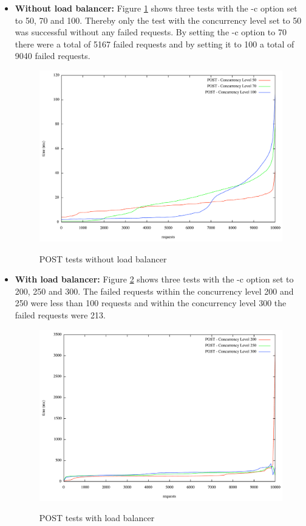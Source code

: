\begin{itemize}
\item{\textbf{Without load balancer:}} Figure \ref{fig:post_without_load} shows three tests with the -c option set to 50, 70 and 100. Thereby only the test with the concurrency level set to 50 was successful without any failed requests. By setting the -c option to 70 there were a total of 5167 failed requests and by setting it to 100 a total of 9040 failed requests.

\begin{figure}[htb]
  \centering
  \includegraphics[scale=0.4]{img/Without_LoadBalancer_100_70_50_POST}\\
  \caption{POST tests without load balancer}
  \label{fig:post_without_load}
\end{figure}

\item{\textbf{With load balancer:}} Figure \ref{fig:get_with_load} shows three tests with the -c option set to 200, 250 and 300. The  failed requests within the concurrency level 200 and 250 were less than 100 requests and within the concurrency level 300 the failed requests were 213.

\begin{figure}[htb]
  \centering
  \includegraphics[scale=0.4]{img/With_LoadBalancer_200_250_300_POST}\\
  \caption{POST tests with load balancer}
  \label{fig:get_with_load}
\end{figure}
\end{itemize}